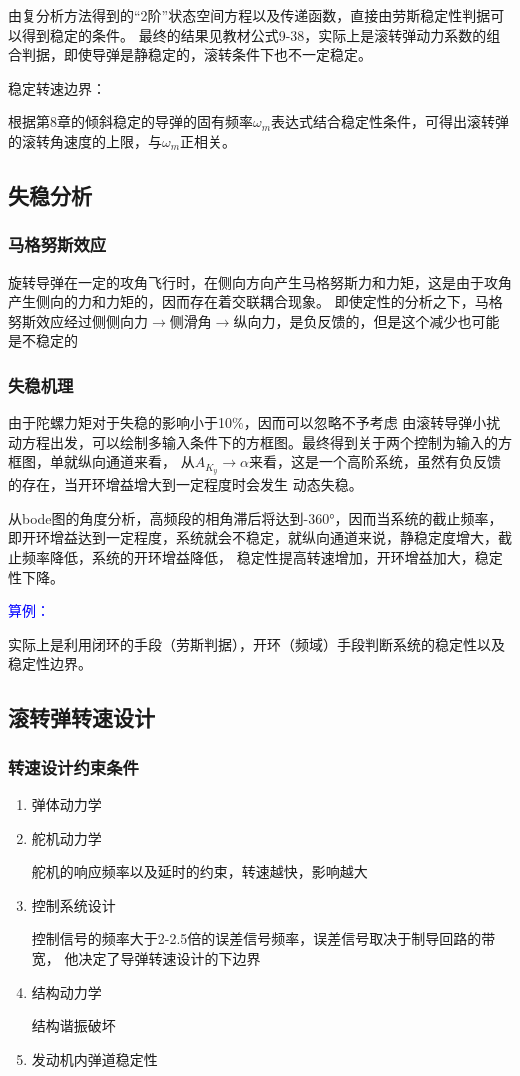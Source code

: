 由复分析方法得到的“2阶”状态空间方程以及传递函数，直接由劳斯稳定性判据可以得到稳定的条件。
最终的结果见教材公式9-38，实际上是滚转弹动力系数的组合判据，即使导弹是静稳定的，滚转条件下也不一定稳定。

{\heiti 稳定转速边界：}

根据第8章的倾斜稳定的导弹的固有频率$\omega_m$表达式结合稳定性条件，可得出滚转弹的滚转角速度的上限，与$\omega_m$正相关。
\subsection{失稳分析}
\subsubsection{马格努斯效应}
旋转导弹在一定的攻角飞行时，在侧向方向产生马格努斯力和力矩，这是由于攻角产生侧向的力和力矩的，因而存在着交联耦合现象。
{\kaishu 即使定性的分析之下，马格努斯效应经过侧侧向力$\rightarrow$侧滑角$\rightarrow$纵向力，是负反馈的，但是这个减少也可能是不稳定的}
\subsubsection{失稳机理}
由于陀螺力矩对于失稳的影响小于10\%，因而可以忽略不予考虑
由滚转导弹小扰动方程出发，可以绘制多输入条件下的方框图。最终得到关于两个控制为输入的方框图，单就纵向通道来看，
从$A_{K_y}\rightarrow\alpha$来看，这是一个高阶系统，虽然有负反馈的存在，当开环增益增大到一定程度时会发生
动态失稳。

{\kaishu 从bode图的角度分析，高频段的相角滞后将达到-360°，因而当系统的截止频率，
即开环增益达到一定程度，系统就会不稳定，就纵向通道来说，静稳定度增大，截止频率降低，系统的开环增益降低，
稳定性提高转速增加，开环增益加大，稳定性下降。

\textcolor{blue}{算例：}

实际上是利用闭环的手段（劳斯判据），开环（频域）手段判断系统的稳定性以及稳定性边界。}
\subsection{滚转弹转速设计}
\subsubsection{转速设计约束条件}
\begin{enumerate}
    \item 弹体动力学
    \item 舵机动力学
    
    {\kaishu 舵机的响应频率以及延时的约束，转速越快，影响越大}
    \item 控制系统设计
    
    {\kaishu 控制信号的频率大于2-2.5倍的误差信号频率，误差信号取决于制导回路的带宽，
    他决定了导弹转速设计的下边界}
    \item 结构动力学
    
    {\kaishu 结构谐振破坏}
    \item 发动机内弹道稳定性
\end{enumerate}
